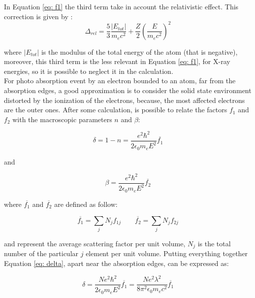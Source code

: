 In Equation \ref{eq: f1} the third term take in account the relativistic effect. This correction is given by \cite{cromer1970relativistic}:
\begin{equation}
\Delta_{rel} = \frac{5}{3} \frac{|E_{tot}|}{m_e c^2} + \frac{Z}{2} \left( \frac{E}{m_e c^2} \right)^2
\label{eq: Delta_rel}
\end{equation}
\begin{flushleft}
where $|E_{tot} |$ is the modulus of the total energy of the atom (that is negative), moreover, this third term is the less relevant in Equation \ref{eq: f1}, for X-ray energies, so it is possible to neglect it in the calculation.
\\
For photo absorption event by an electron bounded to an atom, far from the absorption edges, a good approximation is to consider the solid state environment distorted by the ionization of the electrons, because, the most affected electrons are the outer ones. After some calculation, is possible to relate the factors $f_1 $ and $f_2 $ with the macroscopic parameters $n $ and $\beta $:
\end{flushleft}
\begin{equation}
\delta = 1 - n = \frac{e^2 \hbar^2}{2 \epsilon_0 m_e E^2} \overline{f_1}
\label{eq: delta}
\end{equation}
\begin{flushleft}
and
\end{flushleft}
\begin{equation}
\beta = \frac{e^2 \hbar^2}{2 \epsilon_0 m_e E^2} \overline{f_2}
\label{eq: beta}
\end{equation}
\begin{flushleft}
where $\overline{f_1} $ and $\overline{f_2} $ are defined as follow:
\end{flushleft}
\begin{equation}
\overline{f_1} = \sum_j N_j f_{1j} \qquad \overline{f_2} = \sum_j N_j f_{2j}
\label{f1, f2, mean}
\end{equation}
\begin{flushleft}
and represent the average scattering factor per unit volume, $N_j $ is the total number of the particular $j $ element per unit volume. Putting everything together Equation \ref{eq: delta}, apart near the absorption edges, can be expressed as:
\end{flushleft}
\begin{equation}
\delta = \frac{N e^2 \hbar^2}{2 \epsilon_0 m_e  E^2} \overline{f_1}  = \frac{N e^2 \lambda^2}{8 \pi^2 \epsilon_0 m_e c^2} \overline{f_1}
\label{eq: delta new}
\end{equation}



